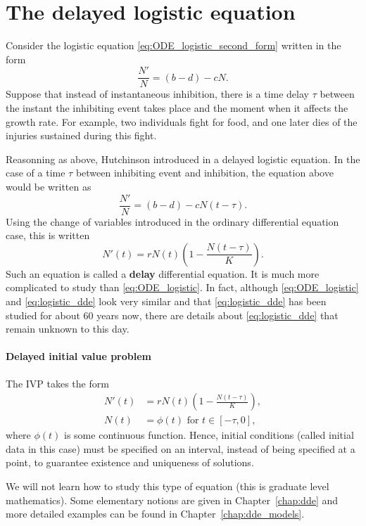 \section{The delayed logistic equation}
\label{sec:DDE_logistic}
Consider the logistic equation \eqref{eq:ODE_logistic_second_form} written in the form
\[
\frac{N'}{N}=(b-d)-cN.
\]
Suppose that instead of instantaneous inhibition, there is a time delay $\tau$ between the instant the inhibiting event takes place and the moment when it affects the growth rate.
For example, two individuals fight for food, and one later dies of the injuries sustained during this fight. 

Reasonning as above, Hutchinson introduced in \cite{Hutchinson1948} a delayed logistic equation. In the case of a time $\tau$ between inhibiting event and inhibition, the equation above would be written as 
\[
\frac{N'}N=(b-d)-cN(t-\tau).
\]
Using the change of variables introduced in the ordinary differential equation case, this is written
\begin{equation}\label{eq:logistic_dde}
N'(t)=rN(t)\left(1-\frac{N(t-\tau)}K\right).
\end{equation}
Such an equation is called a \textbf{delay} differential equation. It is much more complicated to study than \eqref{eq:ODE_logistic}. In fact, although \eqref{eq:ODE_logistic} and \eqref{eq:logistic_dde} look very similar and that \eqref{eq:logistic_dde} has been studied for about 60 years now, there are details about \eqref{eq:logistic_dde} that remain unknown to this day.

\paragraph{Delayed initial value problem}
The IVP takes the form
\begin{equation}\label{ivp:logistic_dde}
\begin{aligned}
N'(t)&= rN(t)\left(1-\frac{N(t-\tau)}K\right),\\
N(t) &= \phi(t)\textrm{ for }t\in[-\tau,0],
\end{aligned}
\end{equation}
where $\phi(t)$ is some continuous function. Hence, initial conditions (called initial data in this case) must be specified on an interval, instead of being specified at a point, to guarantee existence and uniqueness of solutions.

We will not learn how to study this type of equation (this is graduate level mathematics). Some elementary notions are given in Chapter~\ref{chap:dde} and more detailed examples can be found in Chapter~\ref{chap:dde_models}.

